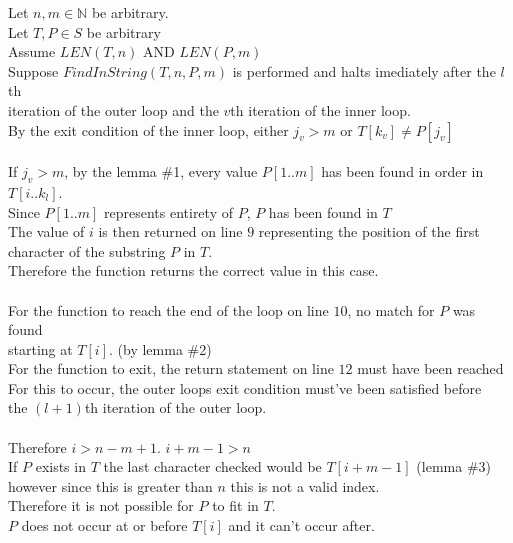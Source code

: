 \documentclass[11pt]{article}
\def\nats {{\mathbb N}}
\newcommand{\And}{\mbox{ AND }}
\begin{document}
\begin{enumerate}
\begin{solution}
\null\quad Let $n, m\in\nats$ be arbitrary.\\
\null\qquad Let $T, P\in S$ be arbitrary \\
\null\qquad\quad Assume $LEN(T, n)\And LEN(P, m)$\\
\null\qquad\quad Suppose $FindInString(T, n, P, m )$ is performed and halts imediately after the $l$th \\
\null\qquad\quad iteration of the outer loop and the $v$th iteration of the inner loop.\\
\null\qquad\quad By the exit condition of the inner loop, either $j_v> m$ or $T[k_v] \ne P[j_v]$\\\\
\null\qquad\qquad If $j_v > m$, by the lemma \#1, every value $P[1..m]$ has been found in order in $T[i..k_l]$.\\
\null\qquad\qquad Since $P[1..m]$ represents entirety of $P$, $P$ has been found in $T$\\
\null\qquad\qquad The value of $i$ is then returned on line $9$ representing the position of the first \\
\null\qquad\qquad character of the substring $P$ in $T$.\\
\null\qquad\quad Therefore the function returns the correct value in this case.\\\\
\null\qquad\qquad For the function to reach the end of the loop on line $10$, no match for $P$ was found \\
\null\qquad\qquad starting at $T[i]$. (by lemma \#2)\\
\null\qquad\qquad For the function to exit, the return statement on line $12$ must have been reached \\
\null\qquad\qquad For this to occur, the outer loops exit condition must've been satisfied before \\
\null\qquad\qquad the $(l+1)$th iteration of the outer loop.\\\\
\null\qquad\qquad Therefore $i> n-m + 1$. $i+m-1>n$ \\
\null\qquad\qquad If $P$ exists in $T$ the last character checked would be $T[i + m - 1]$ (lemma \#3)\\
\null\qquad\qquad however since this is greater than $n$ this is not a valid index.\\
\null\qquad\qquad Therefore it is not possible for $P$ to fit in $T$.\\
\null\qquad\qquad $P$ does not occur at or before $T[i]$ and it can't occur after.\\

\end{solution}
\end{enumerate}
\end{document}

